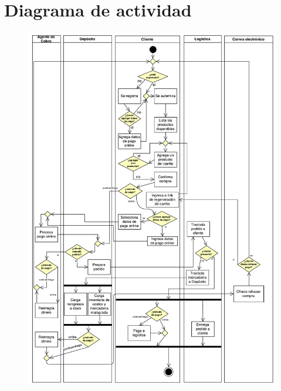 \section{Diagrama de actividad}

\begin{figure}[H]
  \begin{center}
  \includegraphics[width=\textwidth]{images/actividad-compra.pdf}
  \end{center}
\end{figure}
